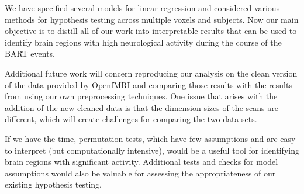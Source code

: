 \par \indent We have specified several models for linear regression and 
considered various methods for hypothesis testing across multiple voxels 
and subjects. Now our main objective is to distill all of our work into 
interpretable results that can be used to identify brain regions with 
high neurological activity during the course of the BART events. 

\par Additional future work will concern reproducing our analysis on the 
clean version of the data provided by OpenfMRI and comparing those results 
with the results from using our own preprocessing techniques. One issue 
that arises with the addition of the new cleaned data is that the dimension 
sizes of the scans are different, which will create challenges for 
comparing the two data sets. 

\par If we have the time, permutation tests, which have few assumptions and 
are easy to interpret (but computationally intensive), would be a useful 
tool for identifying brain regions with significant activity. Additional 
tests and checks for model assumptions would also be valuable for assessing 
the appropriateness of our existing hypothesis testing. 
